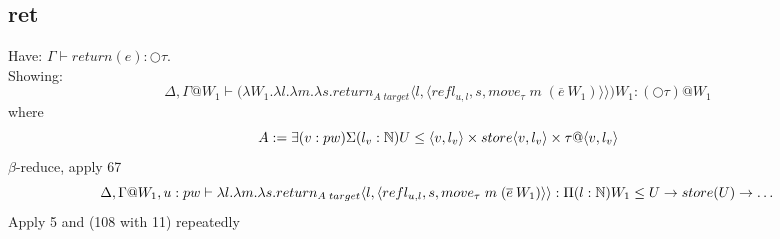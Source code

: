 \message{ !name(paper.tex)}\documentclass{article}
\begin{document}
 \subsection{ret}
Have: $\Gamma \vdash return(e) : \bigcirc \tau$. \\
Showing: \[\Delta,\Gamma@W_1 \vdash \big(\lambda W_1. \lambda l. \lambda m . \lambda s. return_{A\;target} \langle l, \langle refl_{u, l}, s, move_{\tau}\;m\;(\overline{e} \: W_1) \rangle\rangle \big) W_1
: (\bigcirc \tau) @ W_1\]
where 
\[A := \exists(v: pw)\Sigma(l_v : \N)U \leq \langle v, l_v\rangle \times store\langle v, l_v\rangle \times \tau@\langle v, l_v\rangle\]
$\beta$-reduce, apply 67
\[\Delta,\Gamma@W_1, u: pw \vdash \lambda l. \lambda m . \lambda s. return_{A\;target} \langle l, \langle refl_{u, l}, s, move_{\tau}\;m\;(\overline{e} \: W_1) \rangle\rangle
: \Pi(l: \N)W_1 \leq U \imp store(U) \imp \dots \]
Apply 5 and (108 with 11) repeatedly
\end{document}

